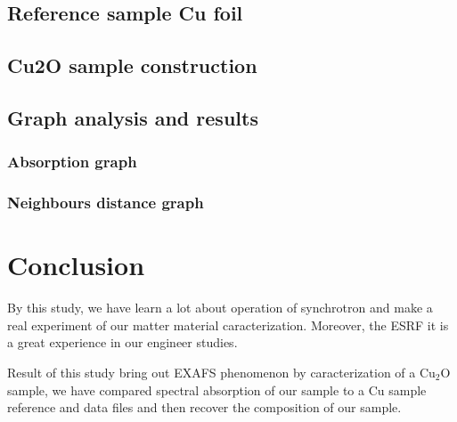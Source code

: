\documentclass[11pt,a4paper,oneside]{article}
\begin{document}
\subsection{Reference sample Cu foil}


\subsection{Cu2O sample construction}


\subsection{Graph analysis and results} \label{results}


\subsubsection{Absorption graph}


\subsubsection{Neighbours distance graph}


\newpage

\section*{Conclusion}

	By this study, we have learn a lot about operation of synchrotron and make a real experiment of our matter material caracterization. Moreover, the ESRF it is a great experience in our engineer studies.\smallskip
	
	Result of this study bring out EXAFS phenomenon by caracterization of a Cu$_2$O sample, we have compared spectral absorption of our sample to a Cu sample reference and data files and then recover the composition of our sample.


\nocite{*}


\end{document}

